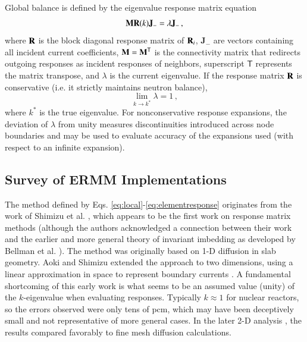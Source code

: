 Global balance is defined by the eigenvalue response matrix
equation
\begin{equation}
  \mathbf{M}\mathbf{R}(k)\mathbf{J_-}  = \lambda \mathbf{J_-} \, ,
  \label{eq:erme}
\end{equation}
where 
$\mathbf{R}$ is the block diagonal response matrix of $\mathbf{R}_i$,  
$\mathbf{J}_{-}$ are vectors containing all incident current coefficients, 
$\mathbf{M}=\mathbf{M}^\mathsf{T}$ is 
the connectivity matrix that redirects outgoing responses as incident
responses of neighbors, superscript $\mathsf{T}$ represents the matrix 
transpose, and $\lambda$ is the current eigenvalue.  
If the response matrix $\mathbf{R}$ is conservative (i.e. it
strictly maintains neutron balance),
\begin{equation}
 \lim_{k\to k^*} \lambda = 1 \, ,
\end{equation}
where $k^*$ is the true eigenvalue.
For nonconservative response expansions, the deviation of $\lambda$ from
unity measures discontinuities introduced across node boundaries and 
may be used to evaluate accuracy of the expansions used (with 
respect to an infinite expansion).


\subsection{Survey of ERMM Implementations}

The method defined by Eqs. \ref{eq:local}-\ref{eq:elementresponse}
originates from the work of Shimizu et al. 
\cite{shimizu1963rmm, shimizu1963arm}, which appears to be the first work 
on response matrix methods (although the authors acknowledged a 
connection between their work and the earlier and more general 
theory of invariant imbedding as developed by Bellman et al. 
\cite{bellman1960iim}).  The method was originally based on 1-D diffusion 
in slab geometry. Aoki and Shimizu extended the approach to two dimensions, 
using a linear approximation in space to represent boundary
currents \cite{aoki1965arm}.
A fundamental shortcoming of this early work is what seems to
be an assumed value (unity) of the $k$-eigenvalue when evaluating responses.
Typically $k \approx 1$ for nuclear reactors, so the errors observed 
were only tens of pcm, which may have been deceptively small
and not representative of more general cases.
In the later 2-D analysis \cite{aoki1965arm}, the results compared 
favorably to fine mesh diffusion calculations.

